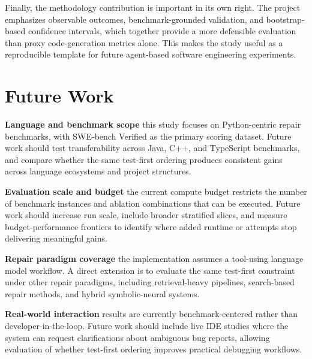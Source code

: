 \documentclass[12pt]{article}
\begin{document}
Finally, the methodology contribution is important in its own right. The project emphasizes observable outcomes, benchmark-grounded validation, and bootstrap-based confidence intervals, which together provide a more defensible evaluation than proxy code-generation metrics alone. This makes the study useful as a reproducible template for future agent-based software engineering experiments.



\section{Future Work}

\textbf{Language and benchmark scope} this study focuses on Python-centric repair benchmarks, with SWE-bench Verified as the primary scoring dataset. Future work should test transferability across Java, C++, and TypeScript benchmarks, and compare whether the same test-first ordering produces consistent gains across language ecosystems and project structures.

\textbf{Evaluation scale and budget} the current compute budget restricts the number of benchmark instances and ablation combinations that can be executed. Future work should increase run scale, include broader stratified slices, and measure budget-performance frontiers to identify where added runtime or attempts stop delivering meaningful gains.

\textbf{Repair paradigm coverage} the implementation assumes a tool-using language model workflow. A direct extension is to evaluate the same test-first constraint under other repair paradigms, including retrieval-heavy pipelines, search-based repair methods, and hybrid symbolic-neural systems.

\textbf{Real-world interaction} results are currently benchmark-centered rather than developer-in-the-loop. Future work should include live IDE studies where the system can request clarifications about ambiguous bug reports, allowing evaluation of whether test-first ordering improves practical debugging workflows.
\end{document}
